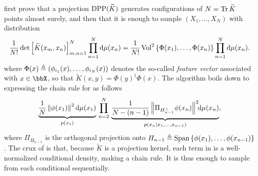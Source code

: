 \documentclass[twoside,11pt]{article}
\begin{document}
      \cite{HKPV06} first prove that a projection $\operatorname{DPP}(\widetilde{K})$ generates configurations of $N=\operatorname{Tr} \widetilde{K}$ points almost surely, and then that it is enough to sample $(X_1,\dots,X_N)$ with distribution
      \begin{equation}
      \label{eq:joint_distribution1}
      \frac{1}{N!} \det \left[ \widetilde K(x_m,x_n) \right]_{m,n=1}^N \prod_{n=1}^N\mathop{}\!\mathrm{d} \mu(x_n) = \frac{1}{N!} \operatorname{Vol}^2\left\{ \Phi(x_1),\dots,\Phi(x_n) \right\} \prod_{n=1}^N \mathop{}\!\mathrm{d}\mu(x_n).
      \end{equation}
      where $\Phi(x) \triangleq \left( \phi_{i_1}(x),\dots,\phi_{i_N}(x) \right)$ denotes the so-called \emph{feature vector} associated with $x\in\bbX$, so that $\tilde{K}(x,y) = \Phi(y)^{\dagger} \Phi(x)$.
      The algorithm boils down to expressing the chain rule for  as follows
      \begin{equation}
      \label{eq:joint_distribution2}
       \underbrace{\frac{1}{N} \left\| \phi(x_1) \right\|^2\mathop{}\!\mathrm{d}\mu(x_1)}_{p(x_1)} \,\prod_{n=2}^{N}\, \underbrace{\frac{1}{N-(n-1)} \left\|  \Pi_{H_{n-1}^{\perp}} \phi(x_n) \right\|^2\!\! \mathop{}\!\mathrm{d}\mu(x_n)}_{p(x_n\vert x_1,\dots,x_{n-1})},
      \end{equation}
	    where $\Pi_{H_{n-1}}$ is the orthogonal projection onto $H_{n-1} \triangleq \operatorname{Span}\left\{ \phi(x_1), \dots, \phi(x_{n-1})  \right\}$.
      The crux of \citet[Algorithm 18]{HKPV06} is that, because $\tilde K$ is a projection kernel, each term in  is a well-normalized conditional density, making  a chain rule.
      It is thus enough to sample from each conditional sequentially.
\end{document}
